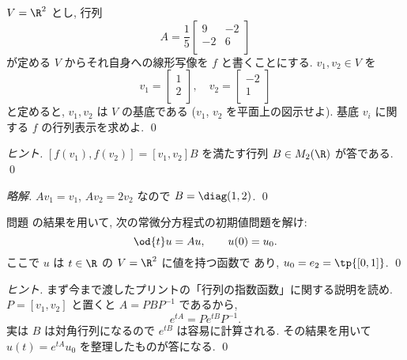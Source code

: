\documentclass[12pt,twoside]{jarticle}
\newcommand\commentout[1]{#1}
\newcommand\commentout[1]{}
\begin{document}
\begin{question}[5点]
  \label{q:9,-2,-2,6}
  $V=\R^2$ とし, 行列
  \begin{equation*}
    A = \frac{1}{5}
    \begin{bmatrix}
      9 & -2 \\
      -2 & 6 \\
    \end{bmatrix}
  \end{equation*}
  が定める $V$ からそれ自身への線形写像を $f$ と書くことにする.
  $v_1,v_2\in V$ を
  \begin{equation*}
    v_1 = %
    \begin{bmatrix} 1 \\ 2 \\ \end{bmatrix},
    \quad
    v_2 = %
    \begin{bmatrix} -2 \\ 1 \\ \end{bmatrix}
  \end{equation*}
  と定めると, $v_1,v_2$ は $V$ の基底である
  ($v_1$, $v_2$ を平面上の図示せよ).
  基底 $v_i$ に関する $f$ の行列表示を求めよ.
  \qed
\end{question}

\begin{proof}[ヒント]
  $[f(v_1),f(v_2)]=[v_1,v_2]B$ を満たす行列 $B\in M_2(\R)$ が答である.
  \qed
\end{proof}

\commentout{
\begin{proof}[略解]
  $Av_1=v_1$, $Av_2=2v_2$ なので $B=\diag(1,2)$. \qed
\end{proof}
}


\begin{question}[10点]
  \label{q:9,-2,-2,6-ODE}
  問題  の結果を用いて,
  次の常微分方程式の初期値問題を解け:
  \begin{equation*}
    \od{t}u = Au, \qquad u(0) = u_0.
  \end{equation*}
  ここで $u$ は $t\in\R$ の $V=\R^2$ に値を持つ函数で
  あり, $u_0 = e_2 = \tp{[0,1]}$.
  \qed
\end{question}

\begin{proof}[ヒント]
  まず今まで渡したプリントの「行列の指数函数」に関する説明を読め.
  $P = [v_1,v_2]$ と置くと $A=PBP^{-1}$ であるから,
  \begin{equation*}
    e^{tA} = Pe^{tB}P^{-1}.
  \end{equation*}
  実は $B$ は対角行列になるので $e^{tB}$ は容易に計算される.
  その結果を用いて $u(t) = e^{tA}u_0$ を整理したものが答になる.
  \qed
\end{proof}
\end{document}
